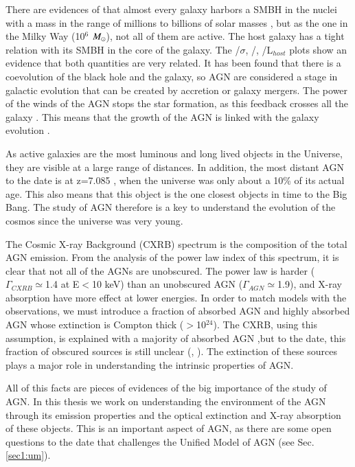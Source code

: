 There are evidences of that almost every galaxy harbors a SMBH in the nuclei with a mass in the range of millions to billions of solar masses \citep{magorrian98}, but as the one in the Milky Way (10$^6$ $M_\odot$), not all of them are active. The host galaxy has a tight relation with its SMBH in the core of the galaxy. The \MSMBH /$\sigma$, \MSMBH/\Mhost,  \MSMBH/L$_{host}$  plots show an evidence that both quantities are very related. It has been found that there is a coevolution of the black hole and the galaxy, so AGN are considered a stage in galactic evolution that can be created by accretion or galaxy mergers. The power of the winds of the AGN stops the star formation, as this feedback crosses all the galaxy \citep{fabian12}. This means that the growth of the AGN is linked with the galaxy evolution \citep{kormendy13}.

As active galaxies are the most luminous and long lived objects in the Universe, they are visible at a large range of distances. In addition, the most distant AGN to the date is at z=7.085 \citep{mortlock11}, when the universe was only about a 10\% of its actual age. This also means that this object is the one closest objects in time to the Big Bang. The study of AGN therefore is a key to understand the evolution of the cosmos since the universe was very young. 


The Cosmic X-ray Background (CXRB) spectrum is the composition of the total AGN emission. From the analysis of the power law index of this spectrum, it is clear that not all of the AGNs are unobscured. The power law is harder ($\Gamma_{CXRB}\simeq$1.4 at E$<$10 keV) than an unobscured AGN ($\Gamma_{AGN}\simeq$1.9), and X-ray absorption have more effect at lower energies. In order to match models with the observations, we must introduce a fraction of absorbed AGN and highly absorbed AGN whose extinction is Compton thick (\NH$>$10$^{24}$\cm). The CXRB, using this assumption, is explained with a majority of absorbed AGN ,but to the date, this fraction of obscured sources is still unclear (\citealt{setti89}, \citealt{comastri95}). The extinction of these sources plays a major role in understanding the intrinsic properties of AGN.

All of this facts are pieces of evidences of the big importance of the study of AGN. In this thesis we work on understanding the environment of the AGN through its emission properties and the optical extinction and X-ray absorption of these objects. This is an important aspect of AGN, as there are some open questions to the date that challenges the Unified Model of AGN  (see Sec. \ref{sec1:um}). 


